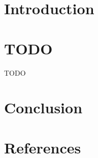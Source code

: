 \maketitle



\tableofcontents



\section*{Introduction}\label{sec:intro}





\section{TODO}\label{sec:TODO}

TODO



\section*{Conclusion}\label{sec:ccl}
 




\section*{References}\label{sec:refs}





%





